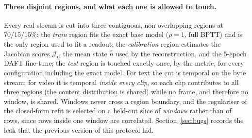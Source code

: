 \documentclass[11pt]{article}
\theoremstyle{definition}
\newcommand{\code}[1]{\texttt{\detokenize{#1}}}
\begin{document}
\paragraph{Three disjoint regions, and what each one is allowed to touch.} Every real stream is cut
into three contiguous, non-overlapping regions at $70/15/15\%$: the \emph{train} region fits the
exact base model ($\rho=1$, full BPTT) and is the only region used to fit a readout; the
\emph{calibration} region estimates the Jacobian scores $\mathcal{J}_i$, the mean state $\bar h$ used
by the reconstruction, and the $5$-epoch DAFT fine-tune; the \emph{test} region is touched exactly
once, by the metric, for every configuration including the exact model. For text the cut is temporal on
the byte stream; for video it is temporal \emph{inside every clip}, so each clip contributes to all
three regions (the content distribution is shared) while no frame, and therefore no window, is shared.
Windows never cross a region boundary, and the regulariser of the closed-form refit is selected on a
held-out slice of \emph{windows} rather than of rows, since rows inside one window are correlated.
Section~\ref{sec:bugs} records the leak that the previous version of this protocol hid.

\begin{table}[tbp]
\centering
\caption{Real-stream models. Held-out numbers are at the long horizon ($L=512$ bytes for Model~D,
$L=32$ frames for Model~E), scored once, on data outside the training stream. The trivial baseline
is the unigram byte distribution for text and the zero predictor for frames. $\mathrm{Gini}(J)$ is
the same Jacobian-concentration statistic used for Models~A--C.}
\label{tab:p6train}


\end{table}

\begin{table}[tbp]
\centering
\caption{Zero-shot decoupling on the real streams. Each cell is the held-out metric with the change
against the exact model in parentheses (BPD: lower is better; $R^2$: higher is better). ``ours''
uses the state-Jacobian ordering $\mathcal{J}_i$ with the mean-state $\bar h$ cold linearisation; the
Picard column
spends one extra cold$\to$hot GEMM and one extra scan.}
\label{tab:p6dec}


\end{table}

\begin{table}[tbp]
\centering
\caption{End-to-end latency on the real streams ($B=8$, fp32, \code{cudaEvent}, warm-up 2, 5
repetitions; the same timing helper as Table~\ref{tab:gpu}, with the shorter budget because each
cell is a $512$-byte/$32$-frame rollout). ``spd.'' columns divide the faster sequential baseline by the $\pi$-CfC time.}
\label{tab:p6hw}


\end{table}
\end{document}
